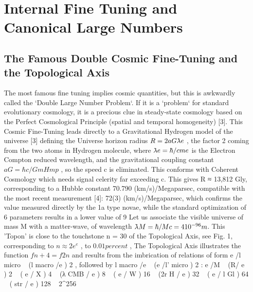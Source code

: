 
\chapter{Internal Fine Tuning and Canonical Large Numbers}
\label{chap:chapter_1}


\section{The Famous Double Cosmic Fine-Tuning and the Topological Axis}
\label{sec:examples}

The most famous fine tuning implies cosmic quantities, but this is awkwardly called the `Double
Large Number Problem`. If it is a `problem` for standard evolutionary cosmology, it is a precious
clue in steady-state cosmology based on the Perfect Cosmological Principle (spatial and temporal
homogeneity) [3].
This Cosmic Fine-Tuning leads directly to a Gravitational Hydrogen model of the universe [3]
defining the Universe horizon radius $R = 2a G \lambdabar e$ , the factor 2 coming from the two atoms in
Hydrogen molecule, where $\lambdabar e = \hbar/cm e$ is the Electron Compton reduced wavelength, and the
gravitational coupling constant $a G = \hbar c/Gm H m p$ , so the speed c is eliminated. This conforms with
Coherent Cosmology which needs signal celerity far exceeding c. This gives R ≈ 13,812 Gly, corresponding to a Hubble constant 70.790 (km/s)/Megaparsec, compatible with the
most recent measurement [4]: 72(3) (km/s)/Megaparsec, which confirms the value measured
directly by the 1a type novae, while the standard optimization of 6 parameters results in a lower
value of 9 %
Let us associate the visible universe of mass M with a matter-wave, of wavelength $\lambdabar M = \hbar /Mc = 4
10^{-96} m$. This 'Topon' is close to the touchstone n = 30 of the Topological Axis, see Fig. 1,
corresponding to $n ≈ 2e^e$ , to $0.01{percent}$ , The Topological Axis illustrates the function $f{n + 4} = f 2 {n}$
and results from the imbrication of relations of form \lambdabar e /l micro ~ (l macro /\lambdabar e ) 2 , followed by l macro /\lambdabar e ~
(\lambdabar e /l' micro ) 2 :
\lambdabar e /\lambdabar M ~ (R/ \lambdabar e ) 2 ~ ( \lambdabar e / \lambdabar X ) 4 ~ (λ CMB / \lambdabar e ) 8 ~ ( \lambdabar e / \lambdabar W ) 16 ~ (2r H / \lambdabar e ) 32 ~ ( \lambdabar e / l Gl ) 64 ~ ( \lambdabar str / \lambdabar e ) 128 ~ 2^{256}
